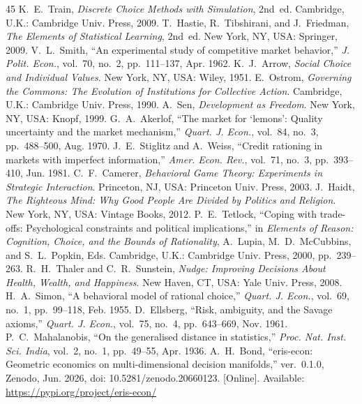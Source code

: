 \documentclass[journal]{IEEEtran}
\begin{document}
\begin{thebibliography}{45}
K.~E.~Train, \emph{Discrete Choice Methods with Simulation}, 2nd~ed.
Cambridge, U.K.: Cambridge Univ. Press, 2009.
T.~Hastie, R.~Tibshirani, and J.~Friedman, \emph{The Elements of Statistical Learning}, 2nd~ed.
New York, NY, USA: Springer, 2009.
V.~L.~Smith, ``An experimental study of competitive market behavior,''
\emph{J. Polit. Econ.}, vol.~70, no.~2, pp.~111--137, Apr. 1962.
K.~J.~Arrow, \emph{Social Choice and Individual Values}.
New York, NY, USA: Wiley, 1951.
E.~Ostrom, \emph{Governing the Commons: The Evolution of Institutions for Collective Action}.
Cambridge, U.K.: Cambridge Univ. Press, 1990.
A.~Sen, \emph{Development as Freedom}.
New York, NY, USA: Knopf, 1999.
G.~A.~Akerlof, ``The market for `lemons': Quality uncertainty and the market mechanism,''
\emph{Quart. J. Econ.}, vol.~84, no.~3, pp.~488--500, Aug. 1970.
J.~E.~Stiglitz and A.~Weiss, ``Credit rationing in markets with imperfect information,''
\emph{Amer. Econ. Rev.}, vol.~71, no.~3, pp.~393--410, Jun. 1981.
C.~F.~Camerer, \emph{Behavioral Game Theory: Experiments in Strategic Interaction}.
Princeton, NJ, USA: Princeton Univ. Press, 2003.
J.~Haidt, \emph{The Righteous Mind: Why Good People Are Divided by Politics and Religion}.
New York, NY, USA: Vintage Books, 2012.
P.~E.~Tetlock, ``Coping with trade-offs: Psychological constraints and political implications,''
in \emph{Elements of Reason: Cognition, Choice, and the Bounds of Rationality},
A.~Lupia, M.~D.~McCubbins, and S.~L.~Popkin, Eds.
Cambridge, U.K.: Cambridge Univ. Press, 2000, pp.~239--263.
R.~H.~Thaler and C.~R.~Sunstein, \emph{Nudge: Improving Decisions About Health, Wealth, and Happiness}.
New Haven, CT, USA: Yale Univ. Press, 2008.
H.~A.~Simon, ``A behavioral model of rational choice,''
\emph{Quart. J. Econ.}, vol.~69, no.~1, pp.~99--118, Feb. 1955.
D.~Ellsberg, ``Risk, ambiguity, and the Savage axioms,''
\emph{Quart. J. Econ.}, vol.~75, no.~4, pp.~643--669, Nov. 1961.
P.~C.~Mahalanobis, ``On the generalised distance in statistics,''
\emph{Proc. Nat. Inst. Sci. India}, vol.~2, no.~1, pp.~49--55, Apr. 1936.
A.~H.~Bond, ``eris-econ: Geometric economics on multi-dimensional decision manifolds,'' ver.~0.1.0, Zenodo, Jun. 2026, doi: 10.5281/zenodo.20660123. [Online]. Available: \url{https://pypi.org/project/eris-econ/}

\end{thebibliography}
\end{document}
